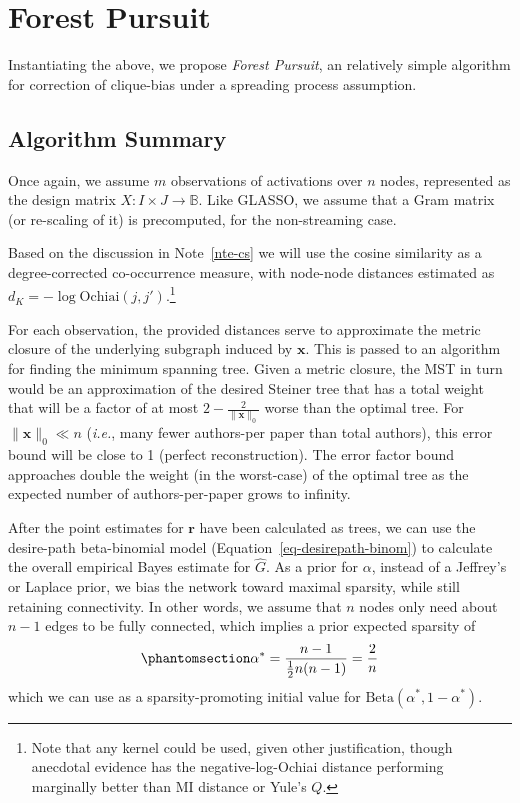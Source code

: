 \documentclass[%
	12pt,
		oneside,
		letterpaper
]{book}
\begin{document}
\section{Forest Pursuit}\label{sec-FP}

Instantiating the above, we propose \emph{Forest Pursuit}, an relatively
simple algorithm for correction of clique-bias under a spreading process
assumption.

\subsection{Algorithm Summary}\label{algorithm-summary}

Once again, we assume \(m\) observations of activations over \(n\)
nodes, represented as the design matrix
\(X:I\times J \rightarrow \mathbb{B}\). Like GLASSO, we assume that a
Gram matrix (or re-scaling of it) is precomputed, for the non-streaming
case.

Based on the discussion in Note~\ref{nte-cs} we will use the cosine
similarity as a degree-corrected co-occurrence measure, with node-node
distances estimated as \(d_K=-\log{\text{Ochiai}(j,j')}\).\footnote{
  Note that any kernel could be used, given other justification, though
  anecdotal evidence has the negative-log-Ochiai distance performing
  marginally better than MI distance or Yule's \(Q\).}

For each observation, the provided distances serve to approximate the
metric closure of the underlying subgraph induced by \(\mathbf{x}\).
This is passed to an algorithm for finding the minimum spanning tree.
Given a metric closure, the MST in turn would be an approximation of the
desired Steiner tree that has a total weight that will be a factor of at
most \(2-\tfrac{2}{\|\mathbf{x}\|_0}\) worse than the optimal
tree.\autocite{fastalgorithmSteiner_Kou1981} For
\(\|\mathbf{x}\|_0 \ll n\) (\emph{i.e.}, many fewer authors-per paper
than total authors), this error bound will be close to 1 (perfect
reconstruction). The error factor bound approaches double the weight (in
the worst-case) of the optimal tree as the expected number of
authors-per-paper grows to infinity.

After the point estimates for \(\mathbf{r}\) have been calculated as
trees, we can use the desire-path beta-binomial model
(Equation~\ref{eq-desirepath-binom}) to calculate the overall empirical
Bayes estimate for \(\hat{G}\). As a prior for \(\alpha\), instead of a
Jeffrey's or Laplace prior, we bias the network toward maximal sparsity,
while still retaining connectivity. In other words, we assume that \(n\)
nodes only need about \(n-1\) edges to be fully connected, which implies
a prior expected sparsity of
\begin{equation}\phantomsection\label{eq-min-connect}{
\alpha^*=\frac{n-1}{\tfrac{1}{2}n(n-1)} = \frac{2}{n}
}\end{equation} which we can use as a sparsity-promoting initial value
for \(\text{Beta}(\alpha^*,1-\alpha^*)\).
\end{document}
